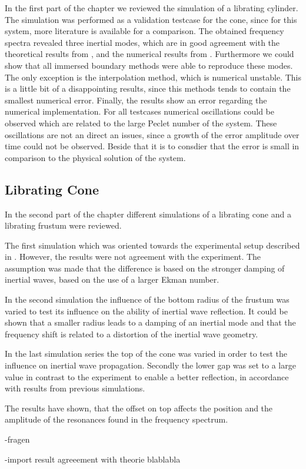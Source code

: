 In the first part of the chapter we reviewed the simulation of a librating cylinder.
The simulation was performed as a validation testcase for the cone,
since for this system, more literature is available for a comparison.
The obtained frequency spectra revealed three inertial modes,
which are in good agreement with the theoretical results from \citep{Greenspan1990},  and the  numerical results from \citep{Sauret2012}.
Furthermore we could show that all immersed boundary methods were able to reproduce these modes.
The only exception is the interpolation method, which is numerical unstable.
This is a little bit of a disappointing results, since this methods tends to contain
the smallest numerical error.
Finally, the results show an error regarding the numerical implementation.
For all testcases numerical oscillations could be observed which are related to the
large Peclet number of the system.
These oscillations are not an direct an issues, since a growth of the error amplitude over time could not be observed.
Beside that it is to consdier that the error is small in comparison to the physical solution of the system.

\subsection{Librating Cone}

In the second part of the chapter different simulations of
a librating cone and a librating frustum were reviewed.

The first simulation which was oriented towards the experimental setup described in \citep{Beardsley1970}.
However, the results  were not agreement with the experiment.
The assumption was made that the difference is based on the  stronger damping of inertial waves,
based on the use of a larger Ekman number.

In the second simulation the influence of the bottom radius of the frustum was varied
to test its influence on the ability of inertial wave reflection.
It could be shown that a smaller radius leads to a damping of an inertial mode and that the frequency
shift is related to a distortion of the inertial wave geometry.

In the last simulation series  the top of the cone was varied in order to test the influence on
inertial wave propagation. Secondly the lower gap was set to a large value in contrast to the experiment
to enable a better reflection, in accordance with results from previous simulations.

The results have shown, that the offset on top affects the position and the amplitude of the resonances
found in the frequency spectrum.

-fragen

-import result agreeement with theorie  blablabla



\clearpage

